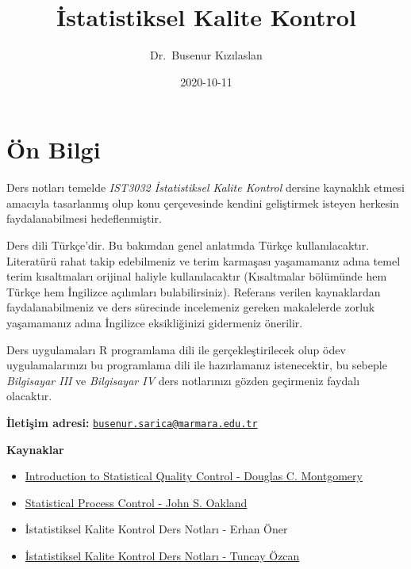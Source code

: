 \documentclass[
]{book}
\title{İstatistiksel Kalite Kontrol}
\author{Dr.~Busenur Kızılaslan}
\date{2020-10-11}
\begin{document}
\maketitle

{
\setcounter{tocdepth}{1}
\tableofcontents
}
\hypertarget{uxf6n-bilgi}{%
\chapter{Ön Bilgi}\label{uxf6n-bilgi}}

Ders notları temelde \emph{IST3032 İstatistiksel Kalite Kontrol} dersine kaynaklık etmesi amacıyla tasarlanmış olup konu çerçevesinde kendini geliştirmek isteyen herkesin faydalanabilmesi hedeflenmiştir.

Ders dili Türkçe'dir. Bu bakımdan genel anlatımda Türkçe kullanılacaktır. Literatürü rahat takip edebilmeniz ve terim karmaşası yaşamamanız adına temel terim kısaltmaları orijinal haliyle kullanılacaktır (Kısaltmalar bölümünde hem Türkçe hem İngilizce açılımları bulabilirsiniz). Referans verilen kaynaklardan faydalanabilmeniz ve ders sürecinde incelemeniz gereken makalelerde zorluk yaşamamanız adına İngilizce eksikliğinizi gidermeniz önerilir.

Ders uygulamaları R programlama dili ile gerçekleştirilecek olup ödev uygulamalarınızı bu programlama dili ile hazırlamanız istenecektir, bu sebeple \emph{Bilgisayar III} ve \emph{Bilgisayar IV} ders notlarınızı gözden geçirmeniz faydalı olacaktır.

\textbf{İletişim adresi:} \href{mailto:busenur.sarica@marmara.edu.tr}{\nolinkurl{busenur.sarica@marmara.edu.tr}}

\textbf{Kaynaklar}

\begin{itemize}
\item
  \href{http://endustri.eskisehir.edu.tr/ipoyraz/TKY302/icerik/text\%20book_montgomery_6th\%20edition.pdf}{Introduction to Statistical Quality Control - Douglas C. Montgomery}
\item
  \href{http://www.diliev.com/Home/materiali/KHEA/referati/6812268-Statistical-Process-Control-eBook-VG.pdf}{Statistical Process Control - John S. Oakland}
\item
  İstatistiksel Kalite Kontrol Ders Notları - Erhan Öner
\item
  \href{http://auzefkitap.istanbul.edu.tr/kitap/endustrimuhlt_ue/istatistikselkalitekontrolu.pdf}{İstatistiksel Kalite Kontrol Ders Notları - Tuncay Özcan}
\end{itemize}
\end{document}
